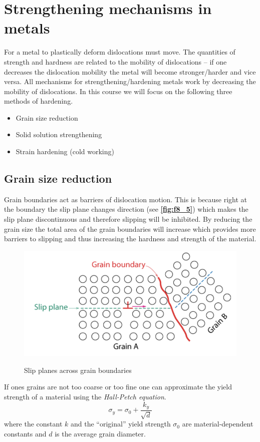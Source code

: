 \section{Strengthening mechanisms in metals}
For a metal to plastically deform dislocations must move. The quantities of strength and hardness are related to the mobility of dislocations -- if one decreases the dislocation mobility the metal will become stronger/harder and vice versa. All mechanisms for strengthening/hardening metals work by decreasing the mobility of dislocations. In this course we will focus on the following three methods of hardening.

\begin{itemize}
  \item Grain size reduction
  \item Solid solution strengthening
  \item Strain hardening (cold working)
\end{itemize}

\subsection{Grain size reduction}
Grain boundaries act as barriers of dislocation motion. This is because right at the boundary the slip plane changes direction (see \textbf{\autoref{fig:f8_5}}) which makes the slip plane discontinuous and therefore slipping will be inhibited. By reducing the grain size the total area of the grain boundaries will increase which provides more barriers to slipping and thus increasing the hardness and strength of the material. 

\begin{figure} [ht]
  \centering
  \caption{Slip planes across grain boundaries}
  \includegraphics[width=0.5\linewidth]{./figures/f8_5.png}
  \label{fig:f8_5}
\end{figure}

If ones grains are not too coarse or too fine one can approximate the yield strength of a material using the \textit{Hall-Petch equation}.
\[ 
\sigma_y = \sigma_0 + \frac{k_y}{\sqrt{d}}
\]
where the constant $k$ and the ``original'' yield strength $\sigma_0$ are material-dependent constants and $d$ is the average grain diameter.


